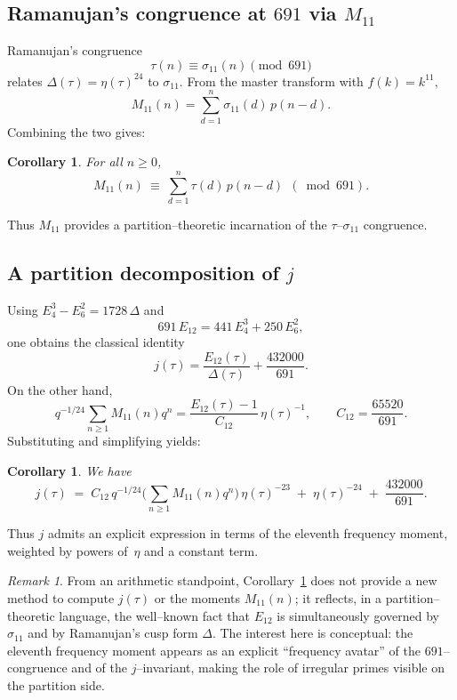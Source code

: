 \documentclass[11pt]{article}
\newtheorem{corollary}[theorem]{Corollary}
\theoremstyle{definition}
\theoremstyle{remark}
\newtheorem{remark}[theorem]{Remark}
\begin{document}
\subsection{Ramanujan’s congruence at $691$ via $M_{11}$}

Ramanujan’s congruence
\[
  \tau(n)\equiv \sigma_{11}(n)\pmod{691}
\]
relates $\Delta(\tau)=\eta(\tau)^{24}$ to $\sigma_{11}$. From the master
transform with $f(k)=k^{11}$,
\[
  M_{11}(n)=\sum_{d=1}^{n}\sigma_{11}(d)\,p(n-d).
\]
Combining the two gives:

\begin{corollary}\label{cor:M11-691}
For all $n\ge0$,
\[
  M_{11}(n)\ \equiv\ \sum_{d=1}^{n}\tau(d)\,p(n-d)\ \ (\bmod 691).
\]
\end{corollary}

Thus $M_{11}$ provides a partition--theoretic incarnation of the
$\tau$--$\sigma_{11}$ congruence.

\subsection{A partition decomposition of $j$}

Using $E_4^3-E_6^2=1728\,\Delta$ and
\[
  691\,E_{12}=441\,E_4^3+250\,E_6^2,
\]
one obtains the classical identity
\[
  j(\tau)=\frac{E_{12}(\tau)}{\Delta(\tau)}+\frac{432000}{691}.
\]
On the other hand,
\[
  q^{-1/24}\sum_{n\ge1} M_{11}(n)q^n=\frac{E_{12}(\tau)-1}{C_{12}}\,\eta(\tau)^{-1}, \qquad C_{12}=\frac{65520}{691}.
\]
Substituting and simplifying yields:

\begin{corollary}\label{cor:j-partition}
We have
\[
    j(\tau)
  \;=\;
  C_{12}\,q^{-1/24}\Big(\sum_{n\ge1}M_{11}(n)q^n\Big)\,\eta(\tau)^{-23}
  \;+\;\eta(\tau)^{-24}
  \;+\;\frac{432000}{691}.
\]
\end{corollary}

Thus $j$ admits an explicit expression in terms of the eleventh
frequency moment, weighted by powers of~$\eta$ and a constant term.

\begin{remark}
From an arithmetic standpoint, Corollary~\ref{cor:j-partition} does
not provide a new method to compute $j(\tau)$ or the moments $M_{11}(n)$;
it reflects, in a partition--theoretic language, the well--known fact
that $E_{12}$ is simultaneously governed by $\sigma_{11}$ and by
Ramanujan's cusp form $\Delta$. The interest here is conceptual: the
eleventh frequency moment appears as an explicit “frequency avatar” of
the $691$--congruence and of the $j$--invariant, making the role of
irregular primes visible on the partition side.
\end{remark}
\end{document}
